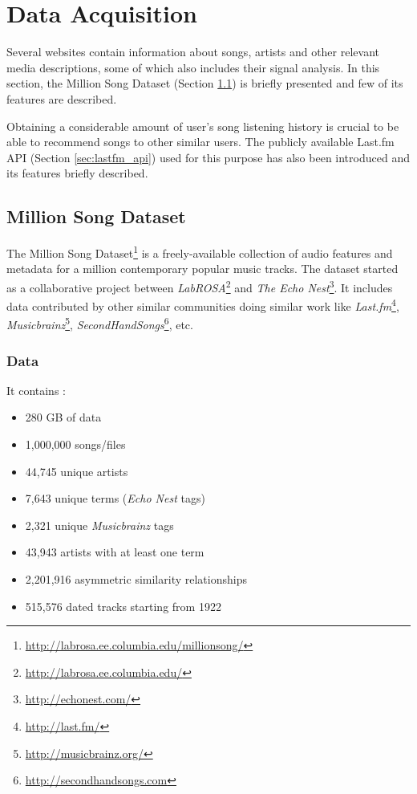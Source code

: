 \chapter{Data Acquisition}
	Several websites contain information about songs, artists and other relevant media descriptions, some of which also includes their signal analysis. In this section, the Million Song Dataset (Section \ref{sec:million_song_dataset}) is briefly presented and few of its features are described.
	
	Obtaining a considerable amount of user's song listening history is crucial to be able to recommend songs to other similar users. The publicly available Last.fm API (Section \ref{sec:lastfm_api}) used for this purpose has also been introduced and its features briefly described.
	
	\section{Million Song Dataset}
	\label{sec:million_song_dataset}
		The Million Song Dataset\footnote{\url{http://labrosa.ee.columbia.edu/millionsong/}} is a freely-available collection of audio features and metadata for a million contemporary popular music tracks. The dataset started as a collaborative project between \emph{LabROSA}\footnote{\url{http://labrosa.ee.columbia.edu/}} and \emph{The Echo Nest}\footnote{\url{http://echonest.com/}}. It includes data contributed by other similar communities doing similar work like \emph{Last.fm}\footnote{\url{http://last.fm/}}, \emph{Musicbrainz}\footnote{\url{http://musicbrainz.org/}}, \emph{SecondHandSongs}\footnote{\url{http://secondhandsongs.com}}, etc.
		
		\subsection{Data}
			It contains \cite{Bertin-Mahieux2011}:
\begin{itemize}
	\item 280 GB of data
	\item 1,000,000 songs/files
	\item 44,745 unique artists
	\item 7,643 unique terms (\emph{Echo Nest} tags)
	\item 2,321 unique \emph{Musicbrainz} tags
	\item 43,943 artists with at least one term
	\item 2,201,916 asymmetric similarity relationships
	\item 515,576 dated tracks starting from 1922
\end{itemize}

